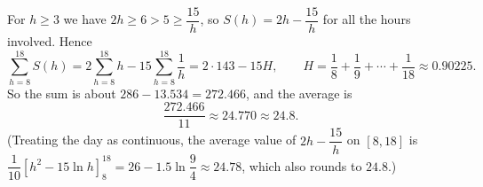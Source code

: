For $h\ge3$ we have $2h\ge6>5\ge\dfrac{15}{h}$, so $S(h)=2h-\dfrac{15}{h}$ for all the hours involved. Hence
\[\sum_{h=8}^{18}S(h)=2\sum_{h=8}^{18}h-15\sum_{h=8}^{18}\dfrac{1}{h}=2\cdot143-15H,\qquad H=\dfrac{1}{8}+\dfrac{1}{9}+\cdots+\dfrac{1}{18}\approx0.90225 .\]
So the sum is about $286-13.534=272.466$, and the average is
\[\dfrac{272.466}{11}\approx24.770\approx\boxed{24.8}.\]
(Treating the day as continuous, the average value of $2h-\dfrac{15}{h}$ on $[8,18]$ is $\dfrac{1}{10}\left[h^2-15\ln h\right]_8^{18}=26-1.5\ln\dfrac{9}{4}\approx24.78$, which also rounds to $24.8$.)
